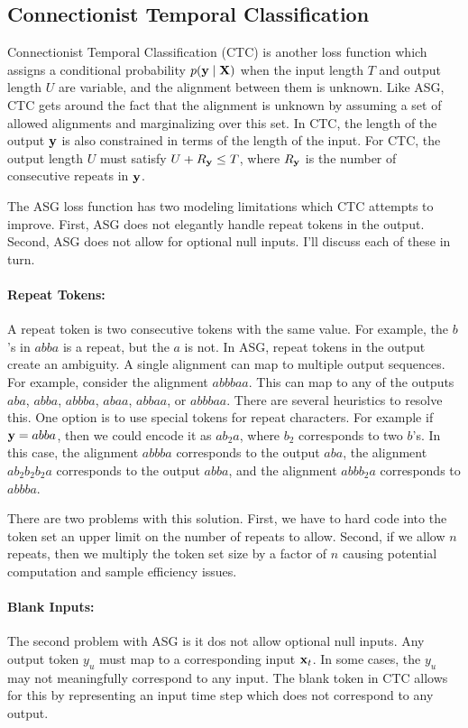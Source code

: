 \subsection{Connectionist Temporal Classification}

Connectionist Temporal Classification (CTC) is another loss function which
assigns a conditional probability $p({\bf y} \mid {\bf X})$ when the input length $T$
and output length $U$ are variable, and the alignment between them is unknown.
Like ASG, CTC gets around the fact that the alignment is unknown by assuming a
set of allowed alignments and marginalizing over this set. In CTC, the length
of the output ${\bf y}$ is also constrained in terms of the length of the input.
For CTC, the output length $U$ must satisfy $U + R_{\bf y} \le T$, where $R_{\bf y}$ is
the number of consecutive repeats in ${\bf y}$.

The ASG loss function has two modeling limitations which CTC attempts to
improve. First, ASG does not elegantly handle repeat tokens in the output.
Second, ASG does not allow for optional null inputs. I'll discuss each of these
in turn.

\paragraph{Repeat Tokens:} A repeat token is two consecutive tokens with the
same value. For example, the $b$'s in $abba$ is a repeat, but the $a$ is not.
In ASG, repeat tokens in the output create an ambiguity. A single alignment can
map to multiple output sequences. For example, consider the alignment $abbbaa$.
This can map to any of the outputs $aba$, $abba$, $abbba$, $abaa$, $abbaa$, or
$abbbaa$. There are several heuristics to resolve this. One option is to use
special tokens for repeat characters. For example if ${\bf y} = abba$, then we
could encode it as $ab_2a$, where $b_2$ corresponds to two $b$'s. In this case,
the alignment $abbba$ corresponds to the output $aba$, the alignment
$ab_2b_2b_2a$ corresponds to the output $abba$, and the alignment $abbb_2a$
corresponds to $abbba$.

There are two problems with this solution. First, we have to hard code into the
token set an upper limit on the number of repeats to allow. Second, if we allow
$n$ repeats, then we multiply the token set size by a factor of $n$ causing
potential computation and sample efficiency issues.

\paragraph{Blank Inputs:} The second problem with ASG is it dos not allow
optional null inputs. Any output token $y_u$ must map to a corresponding input
${\bf x}_t$. In some cases, the $y_u$ may not meaningfully correspond to any input.
The blank token in CTC allows for this by representing an input time step which
does not correspond to any output.

